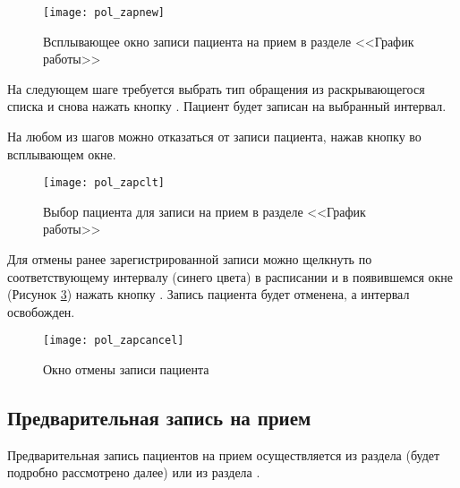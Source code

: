 \begin{figure}[ht]\centering
 \texttt{[image: pol\_zapnew]}
 \caption{Всплывающее окно записи пациента на прием в разделе <<График работы>>}
 \label{img_pol_zapnew}
\end{figure}

На следующем шаге требуется выбрать тип обращения из раскрывающегося списка и снова нажать кнопку . Пациент будет записан на выбранный интервал. 

На любом из шагов можно отказаться от записи пациента, нажав кнопку  во всплывающем окне. 

\begin{figure}[ht]\centering
 \texttt{[image: pol\_zapclt]}
 \caption{Выбор пациента для записи на прием в разделе <<График работы>>}
 \label{img_pol_zapclt}
\end{figure}

Для отмены ранее зарегистрированной записи можно щелкнуть по соответствующему интервалу (синего цвета) в расписании и в появившемся окне (Рисунок \ref{img_pol_zapcancel}) нажать кнопку . Запись пациента будет отменена, а интервал освобожден.

\begin{figure}[ht]\centering
 \texttt{[image: pol\_zapcancel]}
 \caption{Окно отмены записи пациента}
 \label{img_pol_zapcancel}
\end{figure}


\subsection{Предварительная запись на прием}\label{pol_predvz}

{Предварительная запись пациентов на прием осуществляется из раздела  (будет подробно рассмотрено далее) или из раздела .} 

